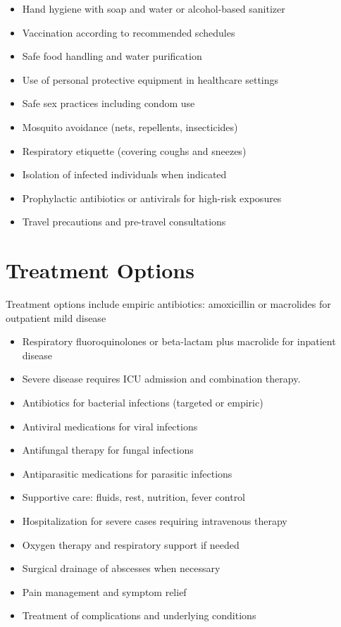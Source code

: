 \begin{itemize}[noitemsep]
  \item Hand hygiene with soap and water or alcohol-based sanitizer
  \item Vaccination according to recommended schedules
  \item Safe food handling and water purification
  \item Use of personal protective equipment in healthcare settings
  \item Safe sex practices including condom use
  \item Mosquito avoidance (nets, repellents, insecticides)
  \item Respiratory etiquette (covering coughs and sneezes)
  \item Isolation of infected individuals when indicated
  \item Prophylactic antibiotics or antivirals for high-risk exposures
  \item Travel precautions and pre-travel consultations
\end{itemize}
\section{Treatment Options}
Treatment options include empiric antibiotics: amoxicillin or macrolides for outpatient mild disease

\begin{itemize}[noitemsep]
  \item Respiratory fluoroquinolones or beta-lactam plus macrolide for inpatient disease
  \item Severe disease requires ICU admission and combination therapy.
  \item Antibiotics for bacterial infections (targeted or empiric)
  \item Antiviral medications for viral infections
  \item Antifungal therapy for fungal infections
  \item Antiparasitic medications for parasitic infections
  \item Supportive care: fluids, rest, nutrition, fever control
  \item Hospitalization for severe cases requiring intravenous therapy
  \item Oxygen therapy and respiratory support if needed
  \item Surgical drainage of abscesses when necessary
  \item Pain management and symptom relief
  \item Treatment of complications and underlying conditions
\end{itemize}
